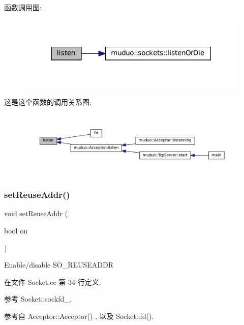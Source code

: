 函数调用图\+:
\nopagebreak
\begin{figure}[H]
\begin{center}
\leavevmode
\includegraphics[width=315pt]{classmuduo_1_1Socket_a458bbe4cf81360301586b2e62a7f9dd2_cgraph}
\end{center}
\end{figure}
这是这个函数的调用关系图\+:
\nopagebreak
\begin{figure}[H]
\begin{center}
\leavevmode
\includegraphics[width=350pt]{classmuduo_1_1Socket_a458bbe4cf81360301586b2e62a7f9dd2_icgraph}
\end{center}
\end{figure}
\mbox{\label{classmuduo_1_1Socket_add291e612aa85998f66e8dd002a942ff}} 
\subsubsection{\texorpdfstring{set\+Reuse\+Addr()}{setReuseAddr()}}
{\footnotesize\ttfamily void set\+Reuse\+Addr (\begin{DoxyParamCaption}\item[{bool}]{on }\end{DoxyParamCaption})}

Enable/disable S\+O\+\_\+\+R\+E\+U\+S\+E\+A\+D\+DR 

在文件 Socket.\+cc 第 34 行定义.



参考 Socket\+::sockfd\+\_\+.



参考自 Acceptor\+::\+Acceptor() , 以及 Socket\+::fd().

